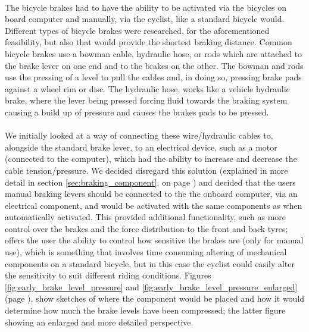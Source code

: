 \documentclass[a4paper]{report}
\begin{document}
{\paragraph{}The bicycle brakes had to have the ability to be activated via the bicycles on board computer and manually, via the cyclist, like a standard bicycle would. Different types of bicycle brakes were researched, for the aforementioned feasibility, but also that would provide the shortest braking distance. Common bicycle brakes use a bowman cable, hydraulic hose, or rods which are attached to the brake lever on one end and to the brakes on the other. The bowman and rods use the pressing of a level to pull the cables and, in doing so, pressing brake pads against a wheel rim or disc. The hydraulic hose, works like a vehicle hydraulic brake, where the lever being pressed forcing fluid towards the braking system causing a build up of pressure and causes the brakes pads to be pressed. 

\paragraph{}We initially looked at a way of connecting these wire/hydraulic cables to, alongside the standard brake lever, to an electrical device, such as a motor (connected to the computer), which had the ability to increase and decrease the cable tension/pressure. We decided disregard this solution (explained in more detail in section \ref{sec:braking_component}, on page \pageref{sec:braking_component}) and decided that the users manual braking levers should be connected to the the onboard computer, via an electrical component, and would be activated with the same components as when automatically activated. This provided additional functionality, such as more control over the brakes and the force distribution to the front and back tyres; offers the user the ability to control how sensitive the brakes are (only for manual use), which is something that involves time consuming altering of mechanical components on a standard bicycle, but in this case the cyclist could easily alter the sensitivity to suit different riding conditions. Figures \ref{fig:early_brake_level_pressure} and \ref{fig:early_brake_level_pressure_enlarged} (page \pageref{app:early_sketches}), show sketches of where the component would be placed and how it would determine how much the brake levels have been compressed; the latter figure showing an enlarged and more detailed perspective.  

}
\end{document}
